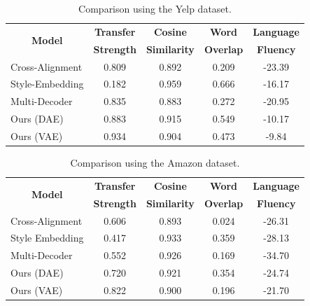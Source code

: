 \documentclass[letterpaper]{article} %
\newcommand{\tabh}[1]{\multicolumn{1}{c|}{\textbf{#1}}}
\newcommand{\tabc}[2]{\multicolumn{1}{|c||}{\multirow{#1}{*}{\textbf{#2}}}}
\begin{document}
\begin{table}[ht]
	\centering
	\begin{tabular}{| l || c | c | c | c |}
		\hline
		\tabc{2}{Model}                            & \tabh{Transfer} & \tabh{Cosine}     & \tabh{Word}    & \tabh{Language} \\
		                                           & \tabh{Strength} & \tabh{Similarity} & \tabh{Overlap} & \tabh{Fluency}  \\
		\hline
		\hline
		Cross-Alignment \cite{shen2017style}       & 0.809           & 0.892             & 0.209          & -23.39          \\
		\hline
		Style-Embedding \cite{fu2017style}         & 0.182           & 0.959             & 0.666          & -16.17          \\
		\hline
		Multi-Decoder \cite{zhao2018adversarially} & 0.835           & 0.883             & 0.272          & -20.95          \\
		\hline
		Ours (DAE)                                 & 0.883           & 0.915             & 0.549          & -10.17          \\
		\hline
		Ours (VAE)                                 & 0.934           & 0.904             & 0.473          & -9.84           \\
		\hline
	\end{tabular}
	\caption{Comparison using the Yelp dataset.}
	\label{tab:yelp-comparison-previous}
\end{table}

\begin{table}[ht]
	\centering
	\begin{tabular}{| l || c | c | c | c |}
		\hline
		\tabc{2}{Model}                            & \tabh{Transfer} & \tabh{Cosine}     & \tabh{Word}    & \tabh{Language} \\
		                                           & \tabh{Strength} & \tabh{Similarity} & \tabh{Overlap} & \tabh{Fluency}  \\
		\hline
		\hline
		Cross-Alignment \cite{shen2017style}       & 0.606           & 0.893             & 0.024          & -26.31          \\
		\hline
		Style Embedding \cite{fu2017style}         & 0.417           & 0.933             & 0.359          & -28.13          \\
		\hline
		Multi-Decoder \cite{zhao2018adversarially} & 0.552           & 0.926             & 0.169          & -34.70          \\
		\hline
		Ours (DAE)                                 & 0.720           & 0.921             & 0.354          & -24.74          \\
		\hline
		Ours (VAE)                                 & 0.822           & 0.900             & 0.196          & -21.70          \\
		\hline
	\end{tabular}
	\caption{Comparison using the Amazon dataset.}
	\label{tab:amazon-comparison-previous}
\end{table}
\end{document}
